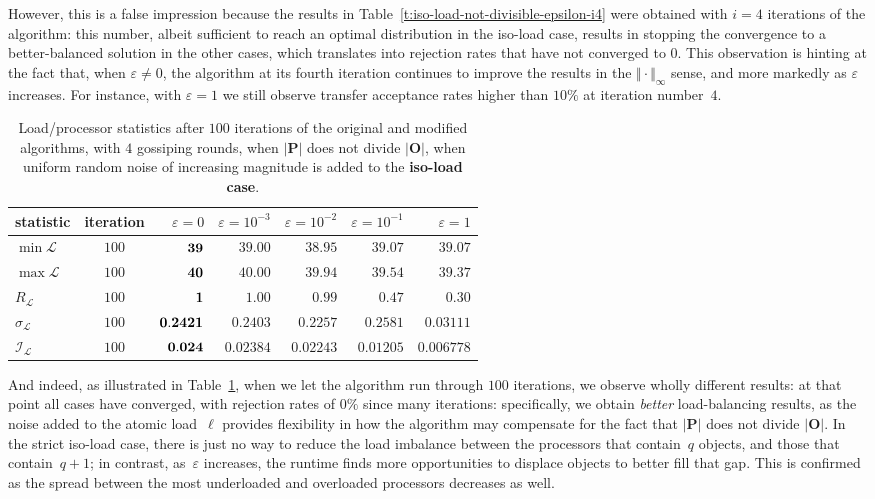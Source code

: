 However, this is a false impression because the results in
Table~\ref{t:iso-load-not-divisible-epsilon-i4} were obtained with
$i=4$ iterations of the algorithm: this
number, albeit sufficient to reach an optimal distribution in the
iso-load case, results in stopping the convergence to a
better-balanced solution in the other cases, which translates into
rejection rates that have not converged to $0$.
This observation is hinting at the fact that, when $\varepsilon\neq0$,
the algorithm at its fourth iteration continues to improve the results
in the $\Vert\cdot\Vert_{\infty}$ sense, and more markedly as
$\varepsilon$ increases. 
For instance, with $\varepsilon=1$ we still observe transfer
acceptance rates higher than $10\%$ at iteration number~$4$.

\begin{table}[htb!]
\begin{center}
\begin{tabular}{@{}lcrrrrr@{}}
\hline
statistic & iteration
& $\varepsilon=0$
& $\varepsilon=10^{-3}$
& $\varepsilon=10^{-2}$
& $\varepsilon=10^{-1}$
& $\varepsilon=1$ \\
\hline\hline
$\min{\mathcal{L}}$
&$100$ &$\bf39$ &$39.00$ &$38.95$ &$39.07$ &$39.07$ \\\hline
$\max{\mathcal{L}}$
&$100$ &$\bf40$ &$40.00$ &$39.94$ &$39.54$ &$39.37$ \\\hline
$R_{\mathcal{L}}$
&$100$ &$\bf1$ &$1.00$ &$0.99$ &$0.47$ &$0.30$ \\\hline
$\sigma_{\mathcal{L}}$
&$100$ &$\bf0.2421$ &$0.2403$ &$0.2257$ &$0.2581$ &$0.03111$ \\\hline
$\mathcal{I}_\mathcal{L}$
&$100$ &$\bf0.024$ &$0.02384$ &$0.02243$ &$0.01205$ &$0.006778$ \\\hline
\end{tabular}
\end{center}
\caption{\label{t:iso-load-not-divisible-epsilon-i100}
Load/processor statistics after $100$ iterations of the
original and modified algorithms, with $4$ gossiping rounds, when
$\vert\mathbf{P}\vert$ does not divide $\vert\mathbf{O}\vert$, when
uniform random noise of increasing magnitude is added to the
\textbf{iso-load case}.}
\end{table}
And indeed, as illustrated in
Table~\ref{t:iso-load-not-divisible-epsilon-i100}, when we let the
algorithm run through $100$ iterations, we observe wholly different
results: at that point all cases have converged, with rejection rates
of $0\%$ since many iterations: specifically, we obtain \emph{better}
load-balancing results, as the noise added to the atomic load~$\ell$
provides flexibility in how the algorithm may compensate for the fact
that $\vert\mathbf{P}\vert$ does not divide $\vert\mathbf{O}\vert$.
In the strict iso-load case, there is just no way to reduce the
load imbalance between the processors that contain~$q$ objects, and
those that contain~$q+1$; in contrast, as~$\varepsilon$ increases, the
runtime finds more opportunities to displace objects to better fill
that gap. This is confirmed as the spread between the most underloaded
and overloaded processors decreases as well.

